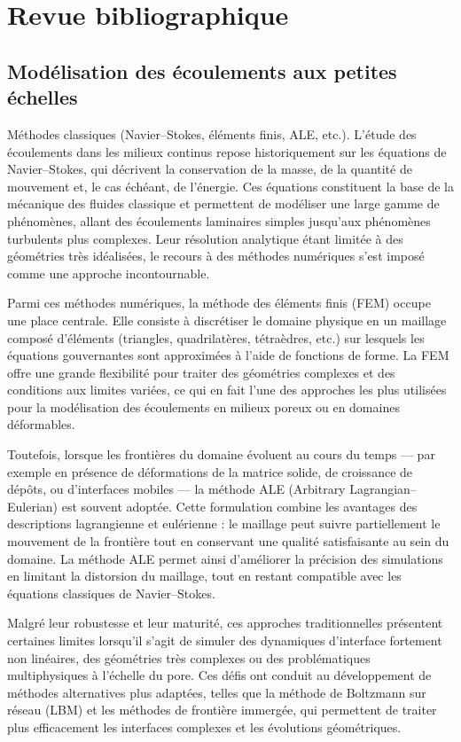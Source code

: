 \documentclass[12pt,a4paper]{report}
\begin{document}

\chapter{Revue bibliographique}

\section{Modélisation des écoulements aux petites échelles}
Méthodes classiques (Navier–Stokes, éléments finis, ALE, etc.).
L’étude des écoulements dans les milieux continus repose historiquement sur les équations de Navier–Stokes, qui décrivent la conservation de la masse, de la quantité de mouvement et, le cas échéant, de l’énergie. Ces équations constituent la base de la mécanique des fluides classique et permettent de modéliser une large gamme de phénomènes, allant des écoulements laminaires simples jusqu’aux phénomènes turbulents plus complexes. Leur résolution analytique étant limitée à des géométries très idéalisées, le recours à des méthodes numériques s’est imposé comme une approche incontournable.

Parmi ces méthodes numériques, la méthode des éléments finis (FEM) occupe une place centrale. Elle consiste à discrétiser le domaine physique en un maillage composé d’éléments (triangles, quadrilatères, tétraèdres, etc.) sur lesquels les équations gouvernantes sont approximées à l’aide de fonctions de forme. La FEM offre une grande flexibilité pour traiter des géométries complexes et des conditions aux limites variées, ce qui en fait l’une des approches les plus utilisées pour la modélisation des écoulements en milieux poreux ou en domaines déformables.

Toutefois, lorsque les frontières du domaine évoluent au cours du temps — par exemple en présence de déformations de la matrice solide, de croissance de dépôts, ou d’interfaces mobiles — la méthode ALE (Arbitrary Lagrangian–Eulerian) est souvent adoptée. Cette formulation combine les avantages des descriptions lagrangienne et eulérienne : le maillage peut suivre partiellement le mouvement de la frontière tout en conservant une qualité satisfaisante au sein du domaine. La méthode ALE permet ainsi d’améliorer la précision des simulations en limitant la distorsion du maillage, tout en restant compatible avec les équations classiques de Navier–Stokes.

Malgré leur robustesse et leur maturité, ces approches traditionnelles présentent certaines limites lorsqu’il s’agit de simuler des dynamiques d’interface fortement non linéaires, des géométries très complexes ou des problématiques multiphysiques à l’échelle du pore. Ces défis ont conduit au développement de méthodes alternatives plus adaptées, telles que la méthode de Boltzmann sur réseau (LBM) et les méthodes de frontière immergée, qui permettent de traiter plus efficacement les interfaces complexes et les évolutions géométriques.
\end{document}
